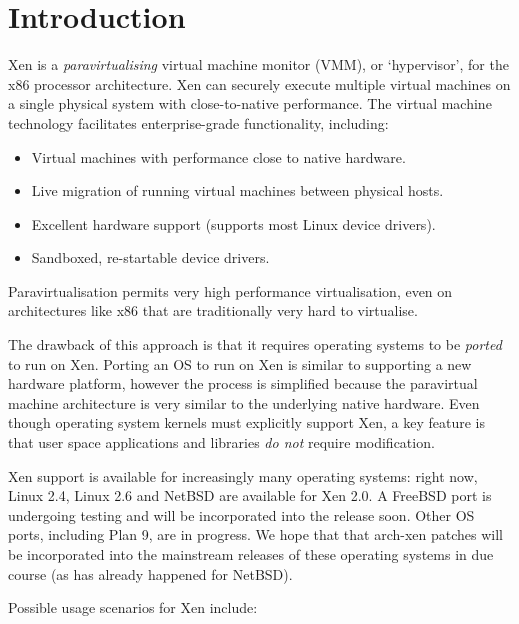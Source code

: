 \chapter{Introduction}


Xen is a \emph{paravirtualising} virtual machine monitor (VMM), or
`hypervisor', for the x86 processor architecture.  Xen can securely
execute multiple virtual machines on a single physical system with
close-to-native performance.  The virtual machine technology
facilitates enterprise-grade functionality, including:

\begin{itemize}
\item Virtual machines with performance close to native hardware.
\item Live migration of running virtual machines between physical
  hosts.
\item Excellent hardware support (supports most Linux device drivers).
\item Sandboxed, re-startable device drivers.
\end{itemize}

Paravirtualisation permits very high performance virtualisation, even
on architectures like x86 that are traditionally very hard to
virtualise.

The drawback of this approach is that it requires operating systems to
be \emph{ported} to run on Xen.  Porting an OS to run on Xen is
similar to supporting a new hardware platform, however the process is
simplified because the paravirtual machine architecture is very
similar to the underlying native hardware. Even though operating
system kernels must explicitly support Xen, a key feature is that user
space applications and libraries \emph{do not} require modification.

Xen support is available for increasingly many operating systems:
right now, Linux 2.4, Linux 2.6 and NetBSD are available for Xen 2.0.
A FreeBSD port is undergoing testing and will be incorporated into the
release soon. Other OS ports, including Plan 9, are in progress.  We
hope that that arch-xen patches will be incorporated into the
mainstream releases of these operating systems in due course (as has
already happened for NetBSD).

Possible usage scenarios for Xen include:

